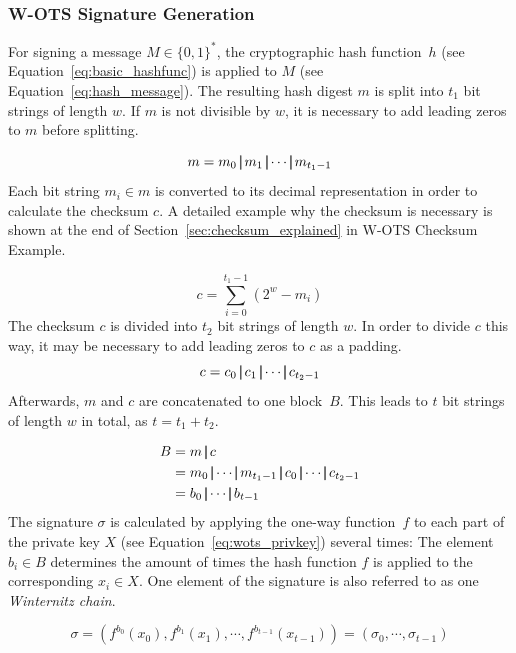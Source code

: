 \subsubsection{W-OTS Signature Generation}
For signing a message $M \in \lbrace 0,1 \rbrace^*$, the cryptographic hash function~$h$ (see Equation~\ref{eq:basic_hashfunc}) is applied to $M$ (see Equation~\ref{eq:hash_message}). The resulting hash digest $m$ is split into $t_1$ bit strings of length $w$. If $m$ is not divisible by $w$, it is necessary to add leading zeros to $m$ before splitting.

\begin{equation}
\label{eq:hash_digest_split}
m = m_0 \operatorname{|\!\!|} m_1 \operatorname{|\!\!|} \cdots \operatorname{|\!\!|} m_{t_1-1}
\end{equation}
Each bit string $m_i \in m$ is converted to its decimal representation in order to calculate the checksum $c$. A detailed example why the checksum is necessary is shown at the end of Section~\ref{sec:checksum_explained} in W-OTS Checksum Example. 

\begin{equation}
\label{eq:checksum_calculation}
c = \sum_{i = 0}^{t_{1}-1}(2^w-m_i)
\end{equation}
The checksum $c$ is divided into $t_2$ bit strings of length $w$. In order to divide $c$ this way, it may be necessary to add leading zeros to $c$ as a padding.
\begin{equation}
c = c_0 \operatorname{|\!\!|} c_1 \operatorname{|\!\!|} \cdots \operatorname{|\!\!|} c_{t_2 - 1}
\end{equation}
Afterwards, $m$ and $c$ are concatenated to one block~$B$. This leads to $t$ bit strings of length $w$ in total, as $t = t_1 + t_2$.

\begin{align}
\label{eq:block_B_out_of_M_and_C}
B &= m \concat c  \\ 
&= m_0 \concat \cdots \concat m_{t_1 - 1} \concat c_0 \concat \cdots \concat c_{t_2 - 1} \nonumber \\
&= b_0 \concat \cdots \concat b_{t-1} \nonumber
\end{align}
The signature $\sigma$ is calculated by applying the one-way function~$f$ to each part of the private key $X$ (see Equation~\ref{eq:wots_privkey}) several times: The element $b_i \in B$ determines the amount of times the hash function $f$ is applied to the corresponding $x_i \in X$. One element of the signature is also referred to as one \textit{Winternitz chain}.

\begin{equation}
\label{eq:wots_sign_calc}
\sigma = (f^{b_0}(x_0), f^{b_1}(x_1), \cdots, f^{b_{t-1}}(x_{t-1})) = (\sigma_0, \cdots, \sigma_{t-1})
\end{equation}

